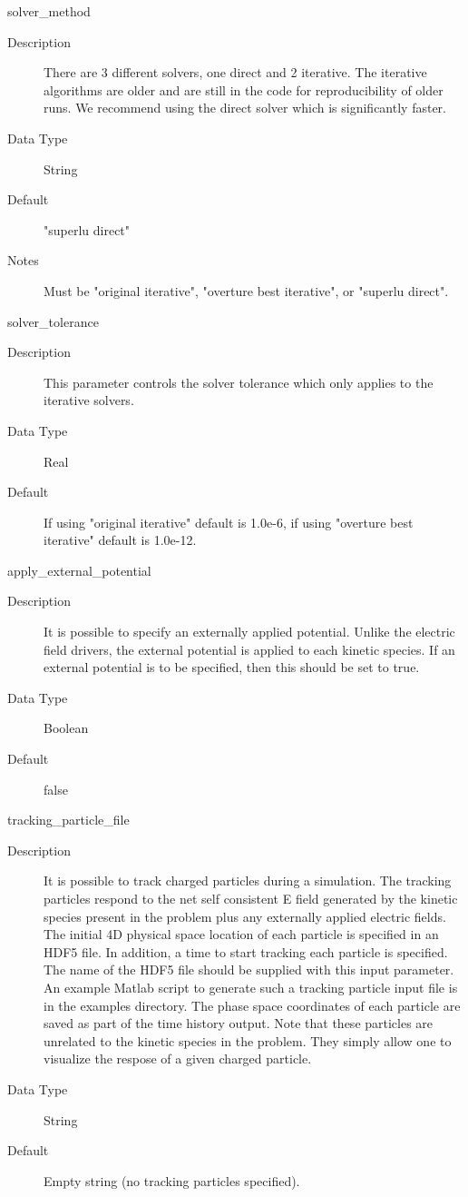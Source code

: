 \documentclass[11pt]{amsart}
\begin{document}
solver\_method
\begin{description}
\item [Description] There are 3 different solvers, one direct and 2 iterative.
The iterative algorithms are older and are still in the code for
reproducibility of older runs.  We recommend using the direct solver which
is significantly faster.
\item [Data Type] String
\item [Default] "superlu direct"
\item [Notes] Must be "original iterative", "overture best iterative", or
"superlu direct".
\end{description}

solver\_tolerance
\begin{description}
\item [Description] This parameter controls the solver tolerance which only
applies to the iterative solvers.
\item [Data Type] Real
\item [Default] If using "original iterative" default is 1.0e-6, if using
"overture best iterative" default is 1.0e-12.
\end{description}

apply\_external\_potential
\begin{description}
\item [Description] It is possible to specify an externally applied potential.
Unlike the electric field drivers, the external potential is applied to each
kinetic species.  If an external potential is to be specified, then this should
be set to true.
\item [Data Type] Boolean
\item [Default] false
\end{description}

tracking\_particle\_file
\begin{description}
\item [Description] It is possible to track charged particles during a
simulation.  The tracking particles respond to the net self consistent E field
generated by the kinetic species present in the problem plus any externally
applied electric fields.  The initial 4D physical space location of each
particle is specified in an HDF5 file.  In addition, a time to start tracking
each particle is specified.  The name of the HDF5 file should be supplied with
this input parameter.  An example Matlab script to generate such a tracking
particle input file is in the examples directory.  The phase space coordinates
of each particle are saved as part of the time history output.  Note that these
particles are unrelated to the kinetic species in the problem.  They simply
allow one to visualize the respose of a given charged particle.
\item [Data Type] String
\item [Default] Empty string (no tracking particles specified).
\end{description}
\end{document}
